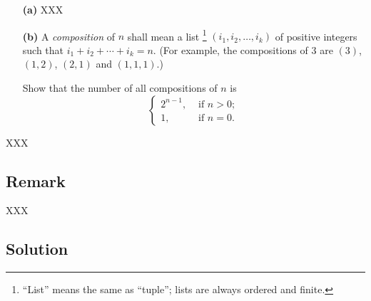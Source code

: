 \documentclass[paper=a4, fontsize=12pt]{scrartcl} %
\newcommand{\tup}[1]{\left( #1 \right)}
\theoremstyle{plainsl}
\theoremstyle{definition}
\theoremstyle{remark}
\begin{document}
\begin{enumerate} %

\item[\textbf{(a)}]
XXX

\item[\textbf{(b)}]
A \textit{composition} of $n$ shall mean a list
\footnote{``List'' means the same as ``tuple'';
          lists are always ordered and finite.}
$\tup{i_1, i_2, \ldots, i_k}$
of positive integers such that $i_1 + i_2 + \cdots + i_k = n$.
(For example, the compositions of $3$ are
$\tup{3}$, $\tup{1, 2}$, $\tup{2, 1}$ and $\tup{1, 1, 1}$.)

Show that the number of all compositions of $n$ is
\[  %
\begin{cases}
2^{n-1}, & \text{ if } n > 0 ; \\
1,       & \text{ if } n = 0 .
\end{cases}
\]
% 
% 

\end{enumerate} %
XXX

\subsection{Remark}

XXX

\subsection{Solution}
\end{document}

